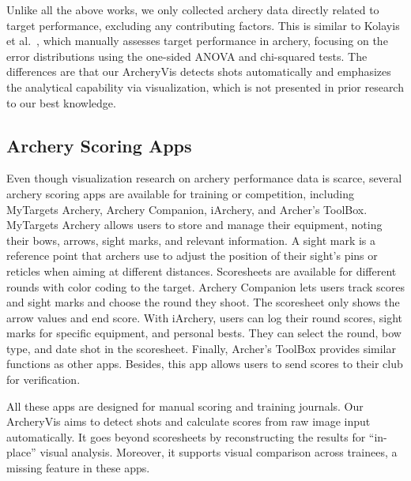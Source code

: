 \documentclass[runningheads]{llncs}
\begin{document}
Unlike all the above works, we only collected archery data directly related to target performance, excluding any contributing factors. 
This is similar to Kolayis et al.\ \cite{Kolayis-PSBS14}, which manually assesses target performance in archery, focusing on the error distributions using the one-sided ANOVA and chi-squared tests. 
% 
The differences are that our ArcheryVis detects shots automatically and emphasizes the analytical capability via visualization, which is not presented in prior research to our best knowledge. 

\subsection{Archery Scoring Apps}

Even though visualization research on archery performance data is scarce, several archery scoring apps are available for training or competition, including MyTargets Archery, Archery Companion, iArchery, and Archer's ToolBox. 
%
MyTargets Archery allows users to store and manage their equipment, noting their bows, arrows, sight marks, and relevant information. 
A sight mark is a reference point that archers use to adjust the position of their sight's pins or reticles when aiming at different distances. 
Scoresheets are available for different rounds with color coding to the target. 
%
Archery Companion lets users track scores and sight marks and choose the round they shoot. The scoresheet only shows the arrow values and end score.
%
With iArchery, users can log their round scores, sight marks for specific equipment, and personal bests. They can select the round, bow type, and date shot in the scoresheet.
%
Finally, Archer's ToolBox provides similar functions as other apps. Besides, this app allows users to send scores to their club for verification.

All these apps are designed for manual scoring and training journals. 
Our ArcheryVis aims to detect shots and calculate scores from raw image input automatically. 
It goes beyond scoresheets by reconstructing the results for ``in-place'' visual analysis. 
Moreover, it supports visual comparison across trainees, a missing feature in these apps. 
 
\end{document}
